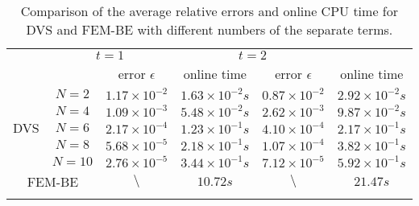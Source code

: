 \documentclass[10pt,a4paper]{article}
\numberwithin{equation}{section}
\numberwithin{lemma}{section}
\numberwithin{example}{section}
\numberwithin{definition}{section}
\numberwithin{assumption}{section}
\numberwithin{theorem}{section}
\numberwithin{proposition}{section}
\numberwithin{corollary}{section}
\numberwithin{remark}{section}
\begin{document}
\begin{table}[hbtp]
\centering
\caption{Comparison of the average relative errors and online CPU time for DVS and FEM-BE with different numbers of the separate terms.}
\vspace*{2pt}
\scriptsize
\begin{tabular}{cc|c|c|c|c}
\Xhline{1pt}
			\multicolumn{2}{c|}{\multirow{2}{*}{\centering Algorithm}}
			&
			\multicolumn{2}{c|}{\centering $t=1$ }
			&
			\multicolumn{2}{c}{\centering $t=2$}\\
		
			\cline{3-6}	
			&
			&
			\multicolumn{1}{c|}{\centering error $\epsilon$ }
			&
			\multicolumn{1}{c|}{\centering online time}
			&
			\multicolumn{1}{c|}{\centering error $\epsilon$ }
			&
			\multicolumn{1}{c}{\centering  online time}\\
			\hline
			\multirow{5}{*}{DVS}  & $N=2$    &  $1.17 \times10^{-2} $   &  $1.63 \times10^{-2}s$  &  $0.87 \times10^{-2} $   &  $2.92 \times10^{-2}s$\\
			\cline{3-6}
			                     & $N=4$    &  $1.09 \times10^{-3} $  &  $5.48 \times10^{-2}s$ &  $2.62 \times10^{-3} $   &  $9.87 \times10^{-2}s$ \\
			\cline{3-6}
			                     & $N=6$    &  $2.17 \times10^{-4} $  &  $1.23 \times10^{-1}s$  &  $4.10 \times10^{-4} $   &  $2.17 \times10^{-1}s$\\
			\cline{3-6}
			                     & $N=8$    &  $5.68 \times10^{-5} $  &  $2.18 \times10^{-1}s$  &  $1.07 \times10^{-4} $   &  $3.82 \times10^{-1}s$\\
			\cline{3-6}
			                     & $N=10$   &  $2.76 \times10^{-5} $  &  $3.44 \times10^{-1}s$ &  $7.12 \times10^{-5} $   &  $5.92 \times10^{-1}s$\\
			\hline
			\multicolumn{2}{c|}{\centering FEM-BE} & $\setminus $ &  $10.72s$ &  $\setminus $   &  $21.47s$\\
			\Xhline{1pt}
		\end{tabular}
		\label{table_burgers}
	\end{table}
	
\end{document}
